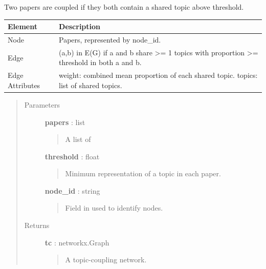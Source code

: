 \documentclass[letterpaper,10pt,english]{sphinxmanual}
\begin{document}
\begin{fulllineitems}
\label{tethne.networks.papers:tethne.networks.papers.topic_coupling}
Two papers are coupled if they both contain a shared topic above threshold.

\begin{tabulary}{\linewidth}{|L|L|}
\hline
\textsf{\relax 
Element
} & \textsf{\relax 
Description
}\\
\hline
Node
 & 
Papers, represented by node\_id.
\\

Edge
 & 
(a,b) in E(G) if a and b share \textgreater{}= 1 topics with
proportion \textgreater{}= threshold in both a and b.
\\

Edge Attributes
 & 
weight: combined mean proportion of each shared topic.
topics: list of shared topics.
\\
\hline\end{tabulary}

\begin{quote}\begin{description}
\item[{Parameters}] \leavevmode
\textbf{papers} : list
\begin{quote}

A list of {\hyperref[tethne.classes.paper:tethne.classes.paper.Paper]{}}
\end{quote}

\textbf{threshold} : float
\begin{quote}

Minimum representation of a topic in each paper.
\end{quote}

\textbf{node\_id} : string
\begin{quote}

Field in {\hyperref[tethne.classes.paper:tethne.classes.paper.Paper]{}} used to identify nodes.
\end{quote}

\item[{Returns}] \leavevmode
\textbf{tc} : networkx.Graph
\begin{quote}

A topic-coupling network.
\end{quote}

\end{description}\end{quote}

\end{fulllineitems}
\end{document}
